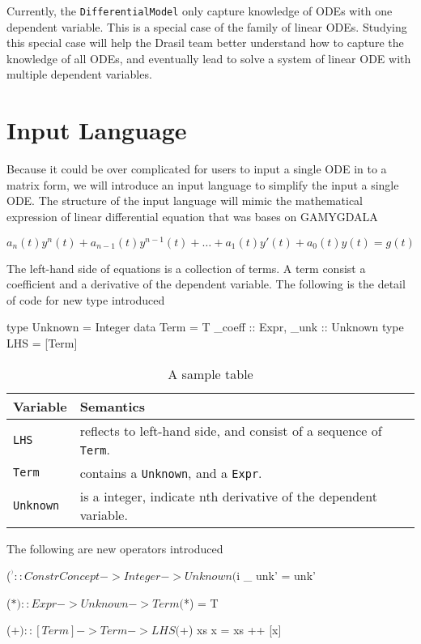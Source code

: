Currently, the \verb|DifferentialModel| only capture knowledge of ODEs with one dependent variable. This is a special case of the family of linear ODEs. Studying this special case will help the Drasil team better understand how to capture the knowledge of all ODEs, and eventually lead to solve a system of linear ODE with multiple dependent variables.

\section{Input Language}
Because it could be over complicated for users to input a single ODE in to a matrix form, we will introduce an input language to simplify the input a single ODE. The structure of the input language will mimic the mathematical expression of linear differential equation that was bases on GAMYGDALA~\citep{popescu2014gamygdala}

\begin{equation} \label{eq_linearDE}
	a_n(t)y^n(t) + a_{n-1}(t)y^{n-1}(t) + \dots + a_1(t)y'(t) + a_0(t)y(t) = g(t)
\end{equation}

The left-hand side of equations is a collection of terms. A term consist a coefficient and a derivative of the dependent variable. The following is the detail of code for new type introduced

\begin{haskell1}
type Unknown = Integer
data Term = T{
	_coeff :: Expr,
	_unk :: Unknown
}
type LHS = [Term]
\end{haskell1}

\begin{table}
	\begin{tabular}{ p{} p{} }
		\textbf{Variable} & \textbf{Semantics} \\
		\toprule
		\verb|LHS| & reflects to left-hand side, and consist of a sequence of \verb|Term|.\\
		\verb|Term| & contains a \verb|Unknown|, and a \verb|Expr|.\\
		\verb|Unknown| & is a integer, indicate nth derivative of the dependent variable.\\
		\bottomrule	
	\end{tabular}	
	\caption{A sample table}	
	\label{tab_inputtype}
\end{table}

The following are new operators introduced
\begin{haskell1}
($^^) :: ConstrConcept -> Integer -> Unknown
($^^) _ unk' = unk'

($*) :: Expr -> Unknown -> Term
($*) = T

($+) :: [Term] -> Term -> LHS
($+) xs x  = xs ++ [x]
\end{haskell1}


